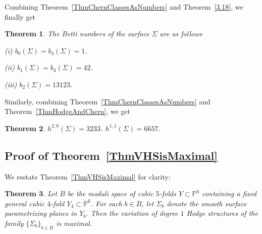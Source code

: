\documentclass{article}
\newtheorem{theorem}{Theorem}[section]
\theoremstyle{definition}
\begin{document}
Combining Theorem~\ref{ThmChernClassesAsNumbers} and Theorem~\ref{3.18}, we finally get
\begin{theorem}\label{ThmBettiNumbers}
    The Betti numbers of the surface $\Sigma$ are as follows

 (i) $b_0(\Sigma) = b_4(\Sigma) = 1$. 
 
    (ii) $b_1(\Sigma) = b_3(\Sigma) = 42$. 
    
    (iii) $b_2(\Sigma) = 13123$.
\end{theorem}

Similarly, combining Theorem~\ref{ThmChernClassesAsNumbers} and Theorem~\ref{ThmHodgeAndChern}, we get
\begin{theorem}\label{ThmHodgeNumbers}
$h^{2, 0}(\Sigma) = 3233$.
$h^{1, 1}(\Sigma) = 6657$.
\end{theorem}

\subsection{Proof of Theorem~\ref{ThmVHSisMaximal}}



We restate Theorem~\ref{ThmVHSisMaximal} for clarity:

\begin{theorem}\label{ThmVHSisMaximalRestated}
Let $B$ be the moduli space of cubic $5$-folds $Y \subset \mathbb{P}^6$ containing a fixed general cubic $4$-fold $Y_4 \subset \mathbb{P}^6$. For each $b \in B$, let $\Sigma_b$ denote the smooth surface parametrizing planes in $Y_b$. Then the variation of degree $1$ Hodge structures of the family $\{\Sigma_b\}_{b \in B}$ is maximal.
\end{theorem}
\end{document}
